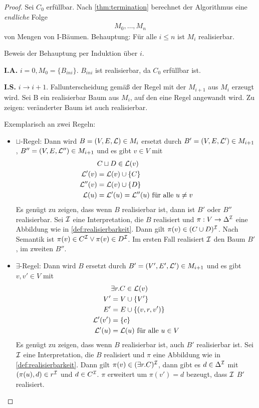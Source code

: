 \begin{proof}
    Sei $C_0$ erfüllbar. Nach \autoref{thm:termination} berechnet der Algorithmus eine \emph{endliche} Folge
    \begin{align*}
        M_0,\ldots,M_n
    \end{align*}
von Mengen von I-Bäumen. Behauptung: Für alle $i\leq n$ ist $M_i$ realisierbar.

\begin{tafel}
Beweis der Behauptung per Induktion über $i$.

\textbf{I.A.} $i = 0, M_0 = \{ B_{ini}\}$. $B_{ini}$ ist realisierbar, da $C_0$ erfüllbar ist.

\textbf{I.S.} $i \rightarrow i + 1$. Fallunterscheidung gemäß der Regel mit der $M_{i + 1}$ aus $M_i$ erzeugt wird. Sei B ein realisierbar Baum aus $M_i$, auf den eine Regel angewandt wird. Zu zeigen: veränderter Baum ist auch realisierbar.

Exemplarisch an zwei Regeln:
\begin{itemize}
    \item $\sqcup$-Regel: Dann wird $B = (V, E, \mathcal{L}) \in M_i$ ersetzt durch $B' = (V, E, \mathcal{L}') \in M_{i + 1}$, $B'' = (V, E, \mathcal{L}'') \in M_{i + 1}$ und es gibt $v \in V$ mit 
        \begin{align*}
            &C \sqcup D \in \mathcal{L}(v)\\
            \mathcal{L}'(v) &= \mathcal{L}(v) \cup \{C\}\\
            \mathcal{L}''(v) &= \mathcal{L}(v) \cup \{D\}\\
            \mathcal{L}(u) &= \mathcal{L}'(u) = \mathcal{L}''(u) \text{ für alle } u \neq v
        \end{align*}
        Es genügt zu zeigen, dass wenn $B$ realisierbar ist, dann ist $B'$ oder $B''$ realisierbar. Sei $\mathcal{I}$ eine Interpretation, die $B$ realisiert und $\pi: V \rightarrow \Delta^{\mathcal{I}}$ eine Abbildung wie in \autoref{def:realisierbarkeit}. Dann gilt $\pi(v) \in (C \cup D)^{\mathcal{I}}$. Nach Semantik ist $\pi(v) \in C^{\mathcal{I}} \vee \pi(v) \in D^{\mathcal{I}}$. Im ersten Fall realisiert $\mathcal{I}$ den Baum $B'$, im zweiten $B''$.
    \item $\exists$-Regel: Dann wird $B$ ersetzt durch $B' = (V', E', \mathcal{L}') \in M_{i + 1}$ und es gibt $v, v' \in V$ mit
        \begin{align*}
            &\exists r.C \in \mathcal{L}(v)\\
            V' &= V \cup \{V'\}\\
            E' &= E \cup \{(v, r, v')\}\\
            \mathcal{L}'(v') &= \{c\}\\
            \mathcal{L}'(u) &= \mathcal{L}(u) \text{ für alle } u \in V
        \end{align*}
        Es genügt zu zeigen, dass wenn $B$ realisierbar ist, auch $B'$ realisierbar ist. Sei $\mathcal{I}$ eine Interpretation, die $B$ realisiert und $\pi$ eine Abbildung wie in \autoref{def:realisierbarkeit}. Dann gilt $\pi(v) \in (\exists r.C)^{\mathcal{I}}$, dann gibt es $d \in \Delta^{\mathcal{I}}$ mit $(\pi(u), d) \in r^{\mathcal{I}}$ und $d \in C^{\mathcal{I}}$. $\pi$ erweitert um $\pi(v') = d$ bezeugt, dass $\mathcal{I}$ $B'$ realisiert.


\end{itemize}
\end{tafel}
\end{proof}
